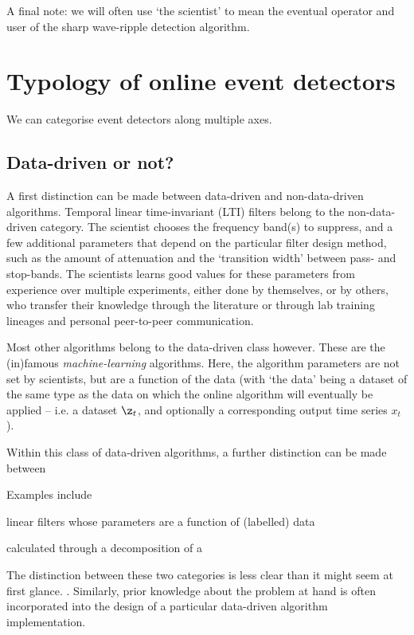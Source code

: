 
A final note: we will often use `the scientist' to mean the eventual operator
and user of the sharp wave-ripple detection algorithm.




\section{Typology of online event detectors}

We can categorise event detectors along multiple axes.

\subsection{Data-driven or not?}

A first distinction can be made between data-driven and non-data-driven
algorithms. Temporal linear time-invariant (LTI) filters belong to the
non-data-driven category. The scientist chooses the frequency band(s) to
suppress, and a few additional parameters that depend on the particular
filter design method, such as the amount of attenuation and the `transition
width' between pass- and stop-bands. The scientists learns good values for
these parameters from experience over multiple experiments, either done by
themselves, or by others, who transfer their knowledge through the literature
or through lab training lineages and personal peer-to-peer communication.

Most other algorithms belong to the data-driven class however. These are the
(in)famous \emph{machine-learning} algorithms. Here, the algorithm parameters
are not set by scientists, but are a function of the data (with `the data'
being a dataset of the same type as the data on which the online algorithm
will eventually be applied -- i.e. a dataset $\z_t$, and optionally a
corresponding output time series $x_t$).

Within this class of data-driven algorithms, a further distinction can be made between



Examples include 

linear filters whose parameters are a function of (labelled) data

calculated through a decomposition of a 




The distinction between these two categories is less clear than it might seem
at first glance. . Similarly, prior knowledge about the problem at hand is
often incorporated into the design of a particular data-driven algorithm
implementation.

